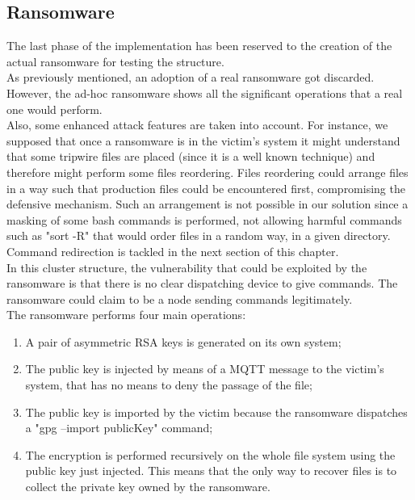 \subsection{Ransomware}

The last phase of the implementation has been reserved to the creation of the actual ransomware for testing the structure.\\
As previously mentioned, an adoption of a real ransomware got discarded. However, the ad-hoc ransomware shows all the significant operations that a real one would perform.\\
Also, some enhanced attack features are taken into account. For instance, we supposed that once a ransomware is in the victim's system it might understand that some tripwire files are placed (since it is a well known technique) and therefore might perform some files reordering. Files reordering could arrange files in a way such that production files could be encountered first, compromising the defensive mechanism. Such an arrangement is not possible in our solution since a masking of some bash commands is performed, not allowing harmful commands such as "sort -R" that would order files in a random way, in a given directory. Command redirection is tackled in the next section of this chapter.\\
In this cluster structure, the vulnerability that could be exploited by the ransomware is that there is no clear dispatching device to give commands. The ransomware could claim to be a node sending commands legitimately.\\
The ransomware performs four main operations:

\begin{enumerate}
  \item A pair of asymmetric RSA keys is generated on its own system;
  \item The public key is injected by means of a MQTT message to the victim's system, that has no means to deny the passage of the file;
  \item The public key is imported by the victim because the ransomware dispatches a "gpg --import publicKey" command;
  \item The encryption is performed recursively on the whole file system using the public key just injected. This means that the only way to recover files is to collect the private key owned by the ransomware.
\end{enumerate}



